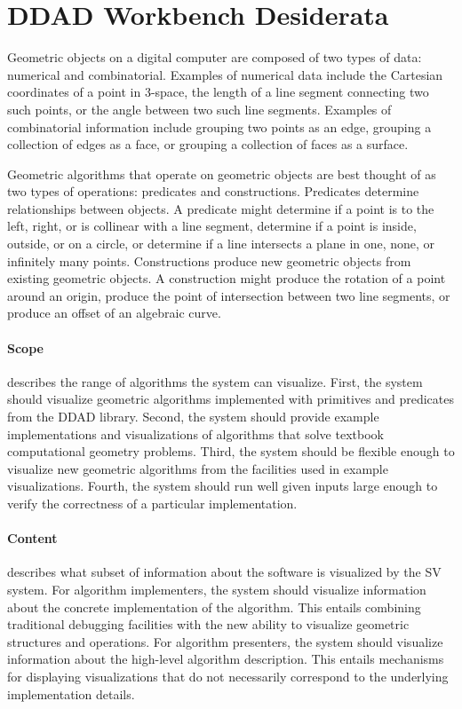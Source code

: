 \FloatBarrier
\section{DDAD Workbench Desiderata}

Geometric objects on a digital computer are composed of two types of data:
numerical and combinatorial. Examples of numerical data include the
Cartesian coordinates of a point in 3-space, the length of a line segment
connecting two such points, or the angle between two such line segments.
Examples of combinatorial information include grouping two points as an
edge, grouping a collection of edges as a face, or grouping a collection of
faces as a surface.

Geometric algorithms that operate on geometric objects are best thought of as
two types of operations: predicates and constructions. Predicates determine
relationships between objects. A predicate might determine if a point is to
the left, right, or is collinear with a line segment, determine if a point is
inside, outside, or on a circle, or determine if a line intersects a plane in
one, none, or infinitely many points. Constructions produce new geometric
objects from existing geometric objects. A construction might produce the
rotation of a point around an origin, produce the point of intersection
between two line segments, or produce an offset of an algebraic curve.

\paragraph{Scope} describes the range of algorithms the system can visualize.
First, the system should visualize geometric algorithms implemented with
primitives and predicates from the DDAD library. Second, the system should
provide example implementations and visualizations of algorithms that solve
textbook computational geometry problems. Third, the system should be flexible
enough to visualize new geometric algorithms from the facilities used in example
visualizations. Fourth, the system should run well given inputs large enough to
verify the correctness of a particular implementation.

\paragraph{Content} describes what subset of information about the software is
visualized by the SV system. For algorithm implementers, the system should
visualize information about the concrete implementation of the algorithm. This
entails combining traditional debugging facilities with the new ability to
visualize geometric structures and operations. For algorithm presenters, the
system should visualize information about the high-level algorithm description.
This entails mechanisms for displaying visualizations that do not necessarily
correspond to the underlying implementation details.

